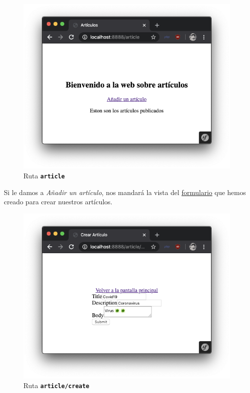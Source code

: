 \begin{figure}[ht]
  \centering
  \includegraphics[width=\textwidth]{../assets/articles_render.png}
  \caption{Ruta \texttt{\textbf{article}}}
  \label{fig:articles_render}
\end{figure}

\clearpage
Si le damos a \textit{Añadir un artículo}, nos mandará la vista del \href{fig:article_create_form}{formulario} que hemos creado para crear nuestros artículos.

\begin{figure}[ht]
  \centering
  \includegraphics[width=\textwidth]{../assets/article_form_render.png}
  \caption{Ruta \texttt{\textbf{article/create}}}
  \label{fig:article_form_render}
\end{figure}

